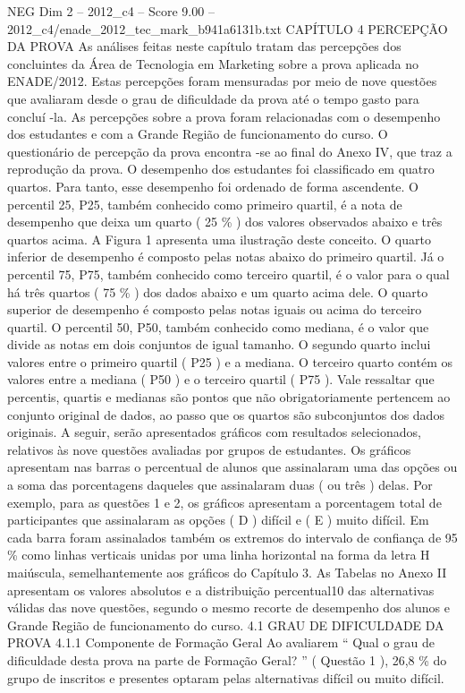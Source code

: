 \begin{textsample}{NEG Dim 2 – 2012\_c4 – Score 9.00 – 2012\_c4/enade\_2012\_tec\_mark\_b941a6131b.txt}  \label{ex:f2_neg_327}
CAPÍTULO 4 PERCEPÇÃO DA PROVA As análises feitas neste capítulo tratam das percepções dos concluintes da Área de Tecnologia em Marketing sobre a prova aplicada no ENADE/2012.
Estas percepções foram mensuradas por meio de nove questões que avaliaram desde o grau de dificuldade da prova até o tempo gasto para concluí -la.
As percepções sobre a prova foram relacionadas com o desempenho dos estudantes e com a Grande Região de funcionamento do curso.
O questionário de percepção da prova encontra -se ao final do Anexo IV, que traz a reprodução da prova.
O desempenho dos estudantes foi classificado em quatro quartos.
Para tanto, esse desempenho foi ordenado de forma ascendente.
O percentil 25, P25, também conhecido como primeiro quartil, é a nota de desempenho que deixa um quarto ( 25 \% ) dos valores observados abaixo e três quartos acima.
A Figura 1 apresenta uma ilustração deste conceito.
O quarto inferior de desempenho é composto pelas notas abaixo do primeiro quartil.
Já o percentil 75, P75, também conhecido como terceiro quartil, é o valor para o qual há três quartos ( 75 \% ) dos dados abaixo e um quarto acima dele.
O quarto superior de desempenho é composto pelas notas iguais ou acima do terceiro quartil.
O percentil 50, P50, também conhecido como mediana, é o valor que divide as notas em dois conjuntos de igual tamanho.
O segundo quarto inclui valores entre o primeiro quartil ( P25 ) e a mediana.
O terceiro quarto contém os valores entre a mediana ( P50 ) e o terceiro quartil ( P75 ).
Vale ressaltar que percentis, quartis e medianas são pontos que não obrigatoriamente pertencem ao conjunto original de dados, ao passo que os quartos são subconjuntos dos dados originais.
A seguir, serão apresentados gráficos com resultados selecionados, relativos às nove questões avaliadas por grupos de estudantes.
Os gráficos apresentam nas barras o percentual de alunos que assinalaram uma das opções ou a soma das porcentagens daqueles que assinalaram duas ( ou três ) delas.
Por exemplo, para as questões 1 e 2, os gráficos apresentam a porcentagem total de participantes que assinalaram as opções ( D ) difícil e ( E ) muito difícil.
Em cada barra foram assinalados também os extremos do intervalo de confiança de 95 \% como linhas verticais unidas por uma linha horizontal na forma da letra H maiúscula, semelhantemente aos gráficos do Capítulo 3.
As Tabelas no Anexo II apresentam os valores absolutos e a distribuição percentual10 das alternativas válidas das nove questões, segundo o mesmo recorte de desempenho dos alunos e Grande Região de funcionamento do curso. 4.1 GRAU DE DIFICULDADE DA PROVA 4.1.1 Componente de Formação Geral Ao avaliarem “ Qual o grau de dificuldade desta prova na parte de Formação Geral? ” ( Questão 1 ), 26,8 \% do grupo de inscritos e presentes optaram pelas alternativas difícil ou muito difícil.

\end{textsample}
